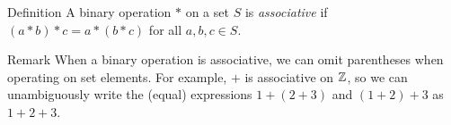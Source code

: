 \begin{df}{Definition} A binary operation $*$ on a set $S$ is \textit{associative}
if $(a*b)*c=a*(b*c)$ for all $a,b,c\in S$.\end{df}

\begin{df}{Remark} When a binary operation is associative,
we can omit parentheses when operating on set elements. For
example, $+$ is associative on $\mathbb{Z}$, so we can unambiguously
write the (equal) expressions $1+(2+3)$ and $(1+2)+3$ as
$1+2+3$.\end{df}


